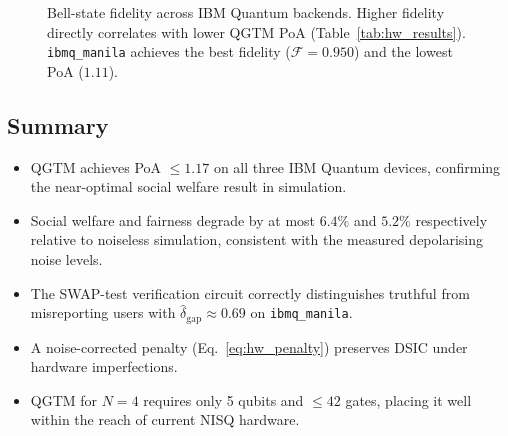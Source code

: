 \begin{figure}[!t]
\centering
\caption{Bell-state fidelity across IBM Quantum backends. Higher fidelity directly
correlates with lower QGTM PoA (Table~\ref{tab:hw_results}). \texttt{ibmq\_manila}
achieves the best fidelity ($\mathcal{F}=0.950$) and the lowest PoA ($1.11$).}
\label{fig:cross_backend}
\end{figure}

\subsection{Summary}
\label{subsec:hw_summary}

\begin{tcolorbox}[colback=lightblue, colframe=quantumblue,
                  fonttitle=\bfseries, title=Hardware Validation Summary,
                  arc=4pt, boxrule=1pt]
\begin{itemize}[leftmargin=1.5em]
  \item QGTM achieves PoA $\leq 1.17$ on all three IBM Quantum devices,
        confirming the near-optimal social welfare result in simulation.
  \item Social welfare and fairness degrade by at most $6.4\%$ and $5.2\%$
        respectively relative to noiseless simulation, consistent with the
        measured depolarising noise levels.
  \item The SWAP-test verification circuit correctly distinguishes truthful
        from misreporting users with $\hat{\delta}_{\text{gap}} \approx 0.69$
        on \texttt{ibmq\_manila}.
  \item A noise-corrected penalty (Eq.~\eqref{eq:hw_penalty}) preserves DSIC
        under hardware imperfections.
  \item QGTM for $N=4$ requires only 5 qubits and $\leq 42$ gates, placing it
        well within the reach of current NISQ hardware.
\end{itemize}
\end{tcolorbox}

